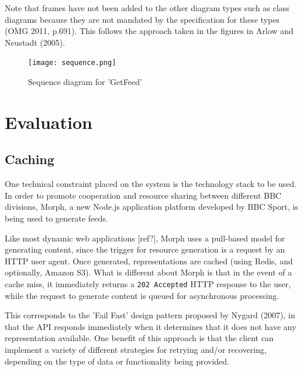 \documentclass{article}
\begin{document}
Note that frames have not been added to the other diagram types such as class diagrams because they are not mandated by the specification for these types (OMG 2011, p.691). This follows the approach taken in the figures in Arlow and Neustadt (2005).

\begin{figure}
  \begin{center}
    \texttt{[image: sequence.png]}
  \end{center}
  \label{sequence-diagram}
  \caption{Sequence diagram for 'GetFeed'}
\end{figure}

\clearpage

\section{Evaluation}

\subsection{Caching}

One technical constraint placed on the system is the technology stack to be used. In order to promote cooperation and resource sharing between different BBC divisions, Morph, a new Node.js application platform developed by BBC Sport, is being used to generate feeds.

Like most dynamic web applications [ref?], Morph uses a pull-based model for generating content, since the trigger for resource generation is a request by an HTTP user agent. Once generated, representations are cached (using Redis, and optionally, Amazon S3). What is different about Morph is that in the event of a cache miss, it immediately returns a \texttt{202 Accepted} HTTP response to the user, while the request to generate content is queued for asynchronous processing. 

This corresponds to the 'Fail Fast' design pattern proposed by Nygard (2007), in that the API responds immediately when it determines that it does not have any representation available. One benefit of this approach is that the client can implement a variety of different strategies for retrying and/or recovering, depending on the type of data or functionality being provided.


\end{document}
